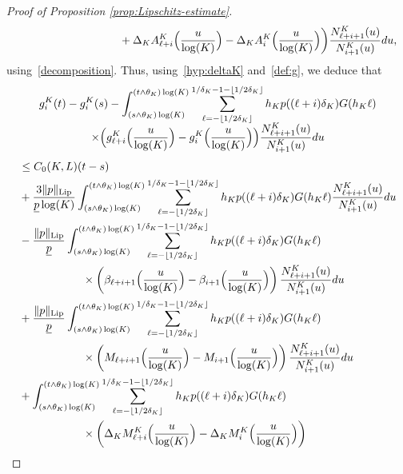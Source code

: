\documentclass[JEP,XML,SOM,Unicode,published]{cedram}
\theoremstyle{plain}
\theoremstyle{remark}
\begin{document}
\begin{proof}[Proof of Proposition \ref{prop:Lipschitz-estimate}]
{\begin{align*}
& \hspace{3.5cm}+ \Delta_KA^K_{\ell+i}\Bigl(\frac{u}{\log(K)}\Bigr)-\Delta_KA^K_{i}\Bigl(\frac{u}{\log(K)}\Bigr)\biggr) \frac{N^K_{\ell+i+1}(u)}{N^K_{i+1}(u)}du ,
\end{align*}
using~\eqref{decomposition}. Thus, using~\eqref{hyp:deltaK} and~\eqref{def:g}, we deduce that\vspace*{-.5\baselineskip}
\begin{multline*}
g^K_{i}(t)-g^K_{i}(s)
- \int_{(s\wedge\theta_K)\log(K)}^{(t\wedge\theta_K)\log(K)} \sum_{\ell=-\lfloor 1/2\delta_K\rfloor}^{1/\delta_K-1-\lfloor 1/2\delta_K\rfloor}
h_{K} p((\ell+i)\delta_K)G(h_{K}\ell) \\[-5pt]
\times \Bigl(g^K_{\ell+i}\Bigl(\frac{u}{\log(K)}\Bigr)-g^K_i\Bigl(\frac{u}{\log(K)}\Bigr)\Bigr)
\frac{N^K_{\ell+i+1}(u)}{N^K_{i+1}(u)}du
\end{multline*}
\begin{align*}
&\leq C_0(K,L)(t-s)\\
& +\frac{{3}\|p\|_{\text{Lip}}}{\underline{p}\log(K)}\int_{(s\wedge\theta_K)\log(K)}^{(t\wedge\theta_K)\log(K)} \sum_{\ell=-\lfloor 1/2\delta_K\rfloor}^{1/\delta_K-1-\lfloor 1/2\delta_K\rfloor}h_Kp((\ell+i)\delta_K)G(h_K\ell)
\frac{N_{\ell+i+1}^K(u)}{N_{i+1}^K(u)}du \\
& -\frac{\|p\|_{\text{Lip}}}{\underline{p}}\int_{(s\wedge\theta_K)\log(K)}^{(t\wedge\theta_K)\log(K)} \sum_{\ell=-\lfloor 1/2\delta_K\rfloor}^{1/\delta_K-1-\lfloor 1/2\delta_K\rfloor}
h_{K} p((\ell+i)\delta_K)G(h_{K}\ell)\\
& \hspace{2cm}\times\left(\beta_{\ell+i+1}\Bigl(\frac{u}{\log(K)}\Bigr)-\beta_{i+1}\Bigl(\frac{u}{\log(K)}\Bigr)\right)
\frac{N^K_{\ell+i+1}(u)}{N^K_{i+1}(u)}du \\
& + \frac{\|p\|_{\text{Lip}}}{\underline{p}}\int_{(s\wedge\theta_K)\log(K)}^{(t\wedge\theta_K)\log(K)} \sum_{\ell=-\lfloor 1/2\delta_K\rfloor}^{1/\delta_K-1-\lfloor 1/2\delta_K\rfloor}
h_{K} p((\ell+i)\delta_K)G(h_{K}\ell)\\
& \hspace{2cm}\times\left(M_{\ell+i+1}\Bigl(\frac{u}{\log(K)}\Bigr)-M_{i+1}\Bigl(\frac{u}{\log(K)}\Bigr)\right)
\frac{N^K_{\ell+i+1}(u)}{N^K_{i+1}(u)}du\\
& + \int_{(s\wedge\theta_K)\log(K)}^{(t\wedge\theta_K)\log(K)} \sum_{\ell=-\lfloor 1/2\delta_K\rfloor}^{1/\delta_K-1-\lfloor 1/2\delta_K\rfloor}
h_{K} p((\ell+i)\delta_K)G(h_{K}\ell)\\
& \hspace{2cm}\times\left(\Delta_KM^K_{\ell+i}\Bigl(\frac{u}{\log(K)}\Bigr)-\Delta_KM^K_{i}\Bigl(\frac{u}{\log(K)}\Bigr)\right)

\end{align*}}
\end{proof}
\end{document}

